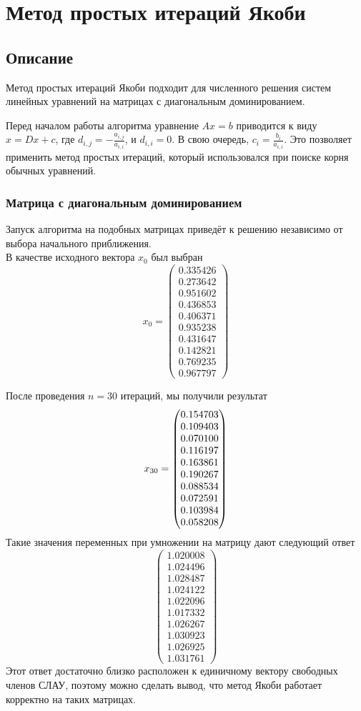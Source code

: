 \documentclass[../../report.tex]{subfiles}
\begin{document}
\chapter{Метод простых итераций Якоби}

\section{Описание}
Метод простых итераций Якоби подходит для численного решения 
систем линейных уравнений на матрицах с диагональным доминированием.

Перед началом работы алгоритма уравнение $Ax=b$ приводится к виду $x = Dx + c$,
где $d_{i,j} = - \frac{a_{i,j}}{a_{i,i}}$, и $d_{i,i} = 0$. 
В свою очередь, $c_i = \frac{b_i}{a_{i,i}}$. Это позволяет применить метод простых итераций,
который использовался при поиске корня обычных уравнений.

\subsection{Матрица с диагональным доминированием}
Запуск алгоритма на подобных матрицах приведёт к 
решению независимо от выбора начального приближения. \\
В качестве исходного вектора $x_0$ был выбран 
\[
x_0 = 
\begin{pmatrix} 
  0.335426 \\ 
  0.273642 \\ 
  0.951602 \\ 
  0.436853 \\ 
  0.406371 \\ 
  0.935238 \\ 
  0.431647 \\ 
  0.142821 \\ 
  0.769235 \\ 
  0.967797 
\end{pmatrix}
\]

После проведения $n = 30$ итераций, мы получили результат 
\[
x_{30} = \begin{pmatrix} 0.154703 \\ 0.109403 \\ 0.070100 \\ 0.116197 \\ 0.163861 \\ 0.190267 \\ 0.088534 \\ 0.072591 \\ 0.103984 \\ 0.058208 \end{pmatrix}
\]
Такие значения переменных при умножении на матрицу дают следующий ответ
\[
\begin{pmatrix}
1.020008 \\
1.024496 \\
1.028487 \\
1.024122 \\
1.022096 \\
1.017332 \\
1.026267 \\
1.030923 \\
1.026925 \\
1.031761
\end{pmatrix}
\]
Этот ответ достаточно близко расположен к единичному вектору свободных членов СЛАУ,
поэтому можно сделать вывод, что метод Якоби работает корректно на таких матрицах.
\end{document}
